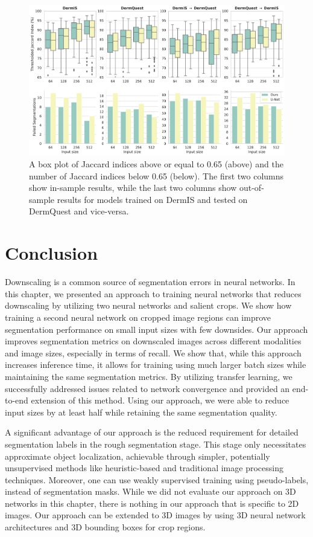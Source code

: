 \begin{figure}[h]
\includegraphics[width=\textwidth]{images/5/e2e/boxplots.pdf}
\caption{A box plot of Jaccard indices above or equal to 0.65 (above) and the number of Jaccard indices below 0.65 (below). The first two columns show in-sample results, while the last two columns show out-of-sample results for models trained on DermIS and tested on DermQuest and vice-versa.} \label{fig:box-plot}
\end{figure}

\clearpage

\section{Conclusion}

Downscaling is a common source of segmentation errors in neural networks. In this chapter, we presented an approach to training neural networks that reduces downscaling by utilizing two neural networks and salient crops. We show how training a second neural network on cropped image regions can improve segmentation performance on small input sizes with few downsides. Our approach improves segmentation metrics on downscaled images across different modalities and image sizes, especially in terms of recall. We show that, while this approach increases inference time, it allows for training using much larger batch sizes while maintaining the same segmentation metrics. By utilizing transfer learning, we successfully addressed issues related to network convergence and provided an end-to-end extension of this method. Using our approach, we were able to reduce input sizes by at least half while retaining the same segmentation quality.

A significant advantage of our approach is the reduced requirement for detailed segmentation labels in the rough segmentation stage. This stage only necessitates approximate object localization, achievable through simpler, potentially unsupervised methods like heuristic-based and traditional image processing techniques. Moreover, one can use weakly supervised training using pseudo-labels, instead of segmentation masks. While we did not evaluate our approach on 3D networks in this chapter, there is nothing in our approach that is specific to 2D images. Our approach can be extended to 3D images by using 3D neural network architectures and 3D bounding boxes for crop regions.

